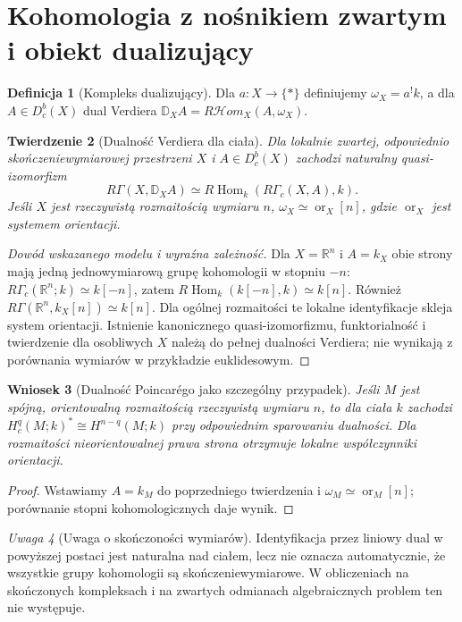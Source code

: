\documentclass[11pt,a4paper,oneside]{report}
\newcommand{\R}{\mathbb{R}}
\theoremstyle{plain}
\newtheorem{twierdzenie}{Twierdzenie}[section]
\newtheorem{wniosek}[twierdzenie]{Wniosek}
\theoremstyle{definition}
\newtheorem{definicja}[twierdzenie]{Definicja}
\theoremstyle{remark}
\newtheorem{uwaga}[twierdzenie]{Uwaga}
\begin{document}
\section{Kohomologia z nośnikiem zwartym i obiekt dualizujący}
\begin{definicja}[Kompleks dualizujący]
Dla $a:X\to\{*\}$ definiujemy $\omega_X=a^!k$,
a dla $A\in D^b_c(X)$ dual Verdiera
$\mathbb D_XA=R\mathcal Hom_X(A,\omega_X)$.
\end{definicja}
\begin{twierdzenie}[Dualność Verdiera dla ciała]
\label{thm:xvi-verdier}
Dla lokalnie zwartej, odpowiednio skończeniewymiarowej
przestrzeni $X$ i $A\in D^b_c(X)$ zachodzi naturalny
quasi-izomorfizm
\[
R\Gamma(X,\mathbb D_X A)
\simeq R\operatorname{Hom}_k(R\Gamma_c(X,A),k).
\]
Jeśli $X$ jest rzeczywistą rozmaitością wymiaru $n$,
$\omega_X\simeq\operatorname{or}_X[n]$, gdzie
$\operatorname{or}_X$ jest systemem orientacji.
\end{twierdzenie}
\begin{proof}[Dowód wskazanego modelu i wyraźna zależność]
Dla $X=\R^n$ i $A=k_X$ obie strony mają jedną
jednowymiarową grupę kohomologii w stopniu $-n$:
$R\Gamma_c(\R^n;k)\simeq k[-n]$, zatem
$R\operatorname{Hom}_k(k[-n],k)\simeq k[n]$.
Również $R\Gamma(\R^n,k_X[n])\simeq k[n]$.
Dla ogólnej rozmaitości te lokalne identyfikacje skleja
system orientacji. Istnienie kanonicznego quasi-izomorfizmu,
funktorialność i twierdzenie dla osobliwych $X$ należą do
pełnej dualności Verdiera; nie wynikają z porównania wymiarów
w przykładzie euklidesowym.
\end{proof}
\begin{wniosek}[Dualność Poincarégo jako szczególny przypadek]
Jeśli $M$ jest spójną, orientowalną rozmaitością rzeczywistą
wymiaru $n$, to dla ciała $k$ zachodzi
$H_c^q(M;k)^*\cong H^{n-q}(M;k)$ przy odpowiednim
sparowaniu dualności. Dla rozmaitości nieorientowalnej
prawa strona otrzymuje lokalne współczynniki orientacji.
\end{wniosek}
\begin{proof}
Wstawiamy $A=k_M$ do poprzedniego twierdzenia i
$\omega_M\simeq\operatorname{or}_M[n]$;
porównanie stopni kohomologicznych daje wynik.
\end{proof}
\begin{uwaga}[Uwaga o skończoności wymiarów]
Identyfikacja przez liniowy dual w powyższej postaci jest
naturalna nad ciałem, lecz nie oznacza automatycznie, że
wszystkie grupy kohomologii są skończeniewymiarowe.
W obliczeniach na skończonych kompleksach i na zwartych
odmianach algebraicznych problem ten nie występuje.
\end{uwaga}
\end{document}
